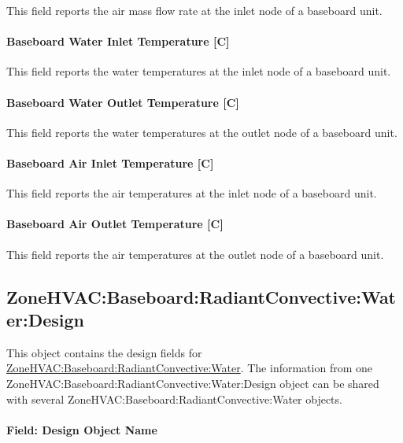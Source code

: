 This field reports the air mass flow rate at the inlet node of a baseboard unit.

\paragraph{Baseboard Water Inlet Temperature {[}C{]}}\label{baseboard-water-inlet-temperature-c}

This field reports the water temperatures at the inlet node of a baseboard unit.

\paragraph{Baseboard Water Outlet Temperature {[}C{]}}\label{baseboard-water-outlet-temperature-c}

This field reports the water temperatures at the outlet node of a baseboard unit.

\paragraph{Baseboard Air Inlet Temperature {[}C{]}}\label{baseboard-air-inlet-temperature-c}

This field reports the air temperatures at the inlet node of a baseboard unit.

\paragraph{Baseboard Air Outlet Temperature {[}C{]}}\label{baseboard-air-outlet-temperature-c}

This field reports the air temperatures at the outlet node of a baseboard unit.

\subsection{ZoneHVAC:Baseboard:RadiantConvective:Water:Design}\label{zonehvac-baseboard-radiantconvective-water-design}

This object contains the design fields for \hyperref[zonehvacbaseboardradiantconvectivewater] {ZoneHVAC:Baseboard:RadiantConvective:Water}. The information from one ZoneHVAC:Baseboard:RadiantConvective:Water:Design object can be shared with several ZoneHVAC:Baseboard:RadiantConvective:Water objects.

\paragraph{Field: Design Object Name}\label{HW_BB_DesignObjectName}

